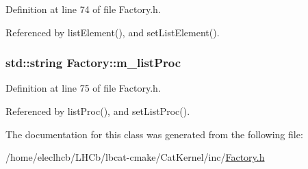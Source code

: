 Definition at line 74 of file Factory.h.

Referenced by listElement(), and setListElement().\hypertarget{classFactory_aec20c1d0a1ef175f55a82e868edabe88}{
\subsubsection[{m\_\-listProc}]{\setlength{\rightskip}{0pt plus 5cm}std::string {\bf Factory::m\_\-listProc}}}
\label{classFactory_aec20c1d0a1ef175f55a82e868edabe88}


Definition at line 75 of file Factory.h.

Referenced by listProc(), and setListProc().

The documentation for this class was generated from the following file:\begin{DoxyCompactItemize}
\item 
/home/eleclhcb/LHCb/lbcat-\/cmake/CatKernel/inc/\hyperlink{Factory_8h}{Factory.h}\end{DoxyCompactItemize}
